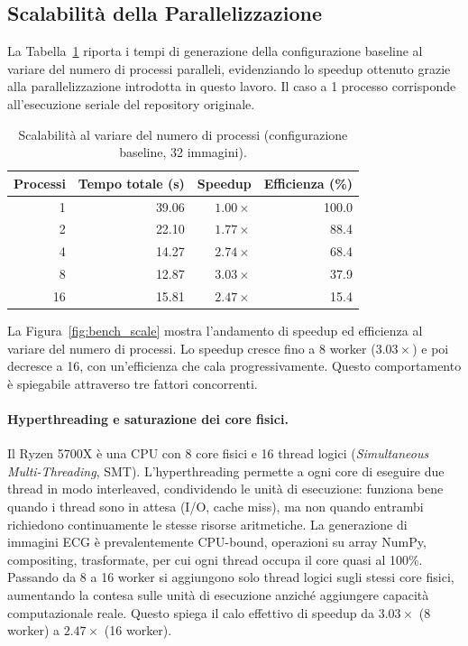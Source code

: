 \subsection{Scalabilità della Parallelizzazione}

La Tabella~\ref{tab:bench_scale} riporta i tempi di generazione della configurazione baseline al variare del numero di processi paralleli, evidenziando lo speedup ottenuto grazie alla parallelizzazione introdotta in questo lavoro. Il caso a 1 processo corrisponde all'esecuzione seriale del repository originale.

\begin{table}[H]
\centering
\caption{Scalabilità al variare del numero di processi (configurazione baseline, 32 immagini).}
\label{tab:bench_scale}
\begin{tabular}{rrrr}
\hline
\textbf{Processi} & \textbf{Tempo totale (s)} & \textbf{Speedup} & \textbf{Efficienza (\%)} \\
\hline
 1 & 39.06 & $1.00\times$ & 100.0 \\
 2 & 22.10 & $1.77\times$ &  88.4 \\
 4 & 14.27 & $2.74\times$ &  68.4 \\
 8 & 12.87 & $3.03\times$ &  37.9 \\
16 & 15.81 & $2.47\times$ &  15.4 \\
\hline
\end{tabular}
\end{table}

La Figura~\ref{fig:bench_scale} mostra l'andamento di speedup ed efficienza al variare del numero di processi. Lo speedup cresce fino a 8 worker ($3.03\times$) e poi decresce a 16, con un'efficienza che cala progressivamente. Questo comportamento è spiegabile attraverso tre fattori concorrenti.

\paragraph{Hyperthreading e saturazione dei core fisici.}
Il Ryzen 5700X è una CPU con 8 core fisici e 16 thread logici (\textit{Simultaneous Multi-Threading}, SMT). L'hyperthreading permette a ogni core di eseguire due thread in modo interleaved, condividendo le unità di esecuzione: funziona bene quando i thread sono in attesa (I/O, cache miss), ma non quando entrambi richiedono continuamente le stesse risorse aritmetiche. La generazione di immagini ECG è prevalentemente CPU-bound, operazioni su array NumPy, compositing, trasformate, per cui ogni thread occupa il core quasi al 100\%. Passando da 8 a 16 worker si aggiungono solo thread logici sugli stessi core fisici, aumentando la contesa sulle unità di esecuzione anziché aggiungere capacità computazionale reale. Questo spiega il calo effettivo di speedup da $3.03\times$ (8 worker) a $2.47\times$ (16 worker).

